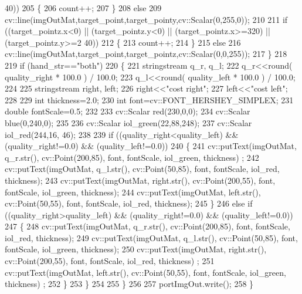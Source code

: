 \begin{DoxyCode}
      40))
205             \{
206                 count++;
207             \}
208             \textcolor{keywordflow}{else}
209                 cv::line(imgOutMat,target\_point,target\_pointy,cv::Scalar(0,255,0));
210 
211             \textcolor{keywordflow}{if} ((target\_pointz.x<0) || (target\_pointz.y<0) || (target\_pointz.x>=320) || (target\_pointz.y>=2
      40))
212             \{
213                 count++;
214             \}
215             \textcolor{keywordflow}{else}
216                 cv::line(imgOutMat,target\_point,target\_pointz,cv::Scalar(0,0,255));            
217         \}
218 
219         \textcolor{keywordflow}{if} (hand\_str==\textcolor{stringliteral}{"both"})
220         \{
221             stringstream q\_r, q\_l;
222             q\_r<<round( quality\_right * 100.0 ) / 100.0;
223             q\_l<<round( quality\_left * 100.0 ) / 100.0;
224 
225             stringstream right, left;
226             right<<\textcolor{stringliteral}{"cost right"};
227             left<<\textcolor{stringliteral}{"cost left"};
228 
229             \textcolor{keywordtype}{int} thickness=2.0;
230             \textcolor{keywordtype}{int} font=cv::FONT\_HERSHEY\_SIMPLEX;
231             \textcolor{keywordtype}{double} fontScale=0.5;
232 
233             cv::Scalar red(230,0,0);
234             cv::Scalar blue(0,240,0);
235 
236             cv::Scalar iol\_green(22,88,248);
237             cv::Scalar iol\_red(244,16, 46);
238 
239             \textcolor{keywordflow}{if} ((quality\_right<quality\_left) && (quality\_right!=0.0) && (quality\_left!=0.0))
240             \{
241                 cv::putText(imgOutMat, q\_r.str(), cv::Point(200,85), font, fontScale, iol\_green, thickness)
      ;
242                 cv::putText(imgOutMat, q\_l.str(), cv::Point(50,85), font, fontScale, iol\_red, thickness);
243                 cv::putText(imgOutMat, right.str(), cv::Point(200,55), font, fontScale, iol\_green, 
      thickness);
244                 cv::putText(imgOutMat, left.str(), cv::Point(50,55), font, fontScale, iol\_red, thickness);
245             \}
246             \textcolor{keywordflow}{else} \textcolor{keywordflow}{if} ((quality\_right>quality\_left) && (quality\_right!=0.0) && (quality\_left!=0.0))
247             \{
248                 cv::putText(imgOutMat, q\_r.str(), cv::Point(200,85), font, fontScale, iol\_red, thickness);
249                 cv::putText(imgOutMat, q\_l.str(), cv::Point(50,85), font, fontScale, iol\_green, thickness);
250                 cv::putText(imgOutMat, right.str(), cv::Point(200,55), font, fontScale, iol\_red, thickness)
      ;
251                 cv::putText(imgOutMat, left.str(), cv::Point(50,55), font, fontScale, iol\_green, thickness)
      ;
252             \}
253         \}
254             
255     \}
256 
257     portImgOut.write();
258 \}
\end{DoxyCode}


